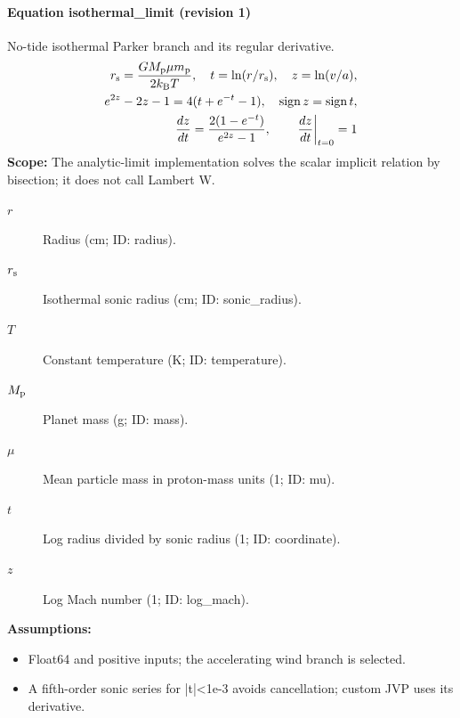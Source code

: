 \paragraph{Equation isothermal\_limit (revision 1)}
No-tide isothermal Parker branch and its regular derivative.
\begin{equation}
\begin{aligned}
r_{\rm s}=\frac{GM_{\rm p}\mu m_{\rm p}}{2k_{\rm B}T},\quad t=\ln(r/r_{\rm s}),\quad z=\ln(v/a),\\
e^{2z}-2z-1=4(t+e^{-t}-1),\quad \operatorname{sign}z=\operatorname{sign}t,\\
\frac{dz}{dt}=\frac{2(1-e^{-t})}{e^{2z}-1},\qquad \left.\frac{dz}{dt}\right|_{t=0}=1
\end{aligned}
\label{eq:escape.parker_5f_wind:isothermal_5f_limit:1}
\end{equation}
\noindent\textbf{Scope:} The analytic-limit implementation solves the scalar implicit relation by bisection; it does not call Lambert W.

\begin{description}
\item[$r$] Radius (cm; ID: radius).
\item[$r_{\rm s}$] Isothermal sonic radius (cm; ID: sonic\_radius).
\item[$T$] Constant temperature (K; ID: temperature).
\item[$M_{\rm p}$] Planet mass (g; ID: mass).
\item[$\mu$] Mean particle mass in proton-mass units (1; ID: mu).
\item[$t$] Log radius divided by sonic radius (1; ID: coordinate).
\item[$z$] Log Mach number (1; ID: log\_mach).
\end{description}

\noindent\textbf{Assumptions:}
\begin{itemize}
\item Float64 and positive inputs; the accelerating wind branch is selected.
\item A fifth-order sonic series for |t|<1e-3 avoids cancellation; custom JVP uses its derivative.
\end{itemize}

